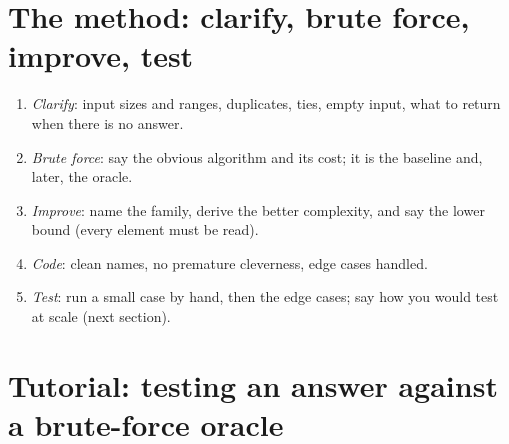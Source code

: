 \label{lst:iv:algorithms-and-data-structures:levels}

\section{The method: clarify, brute force, improve, test}

\begin{method}\label{met:iv:algorithms-and-data-structures:method}
\begin{enumerate}
\item \emph{Clarify}: input sizes and ranges, duplicates, ties, empty input, what to return when there is no answer.
\item \emph{Brute force}: say the obvious algorithm and its cost; it is the baseline and, later, the oracle.
\item \emph{Improve}: name the family, derive the better complexity, and say the lower bound (every element must be read).
\item \emph{Code}: clean names, no premature cleverness, edge cases handled.
\item \emph{Test}: run a small case by hand, then the edge cases; say how you would test at scale (next section).
\end{enumerate}
\end{method}

\section{Tutorial: testing an answer against a brute-force oracle}\label{tut:iv:algorithms-and-data-structures:oracle}

